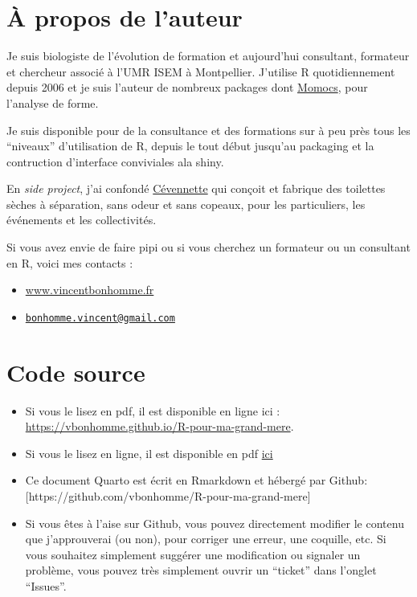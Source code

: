 \documentclass[
  letterpaper,
  DIV=11,
  numbers=noendperiod]{scrreprt}
\providecommand{\tightlist}{%
  \setlength{\itemsep}{0pt}\setlength{\parskip}{0pt}}\usepackage{longtable,booktabs,array}
\begin{document}
\hypertarget{uxe0-propos-de-lauteur}{%
\section*{À propos de l'auteur}\label{uxe0-propos-de-lauteur}}


Je suis biologiste de l'évolution de formation et aujourd'hui
consultant, formateur et chercheur associé à l'UMR ISEM à Montpellier.
J'utilise R quotidiennement depuis 2006 et je suis l'auteur de nombreux
packages dont \href{https://github.com/MomX/Momocs}{Momocs}, pour
l'analyse de forme.

Je suis disponible pour de la consultance et des formations sur à peu
près tous les ``niveaux'' d'utilisation de R, depuis le tout début
jusqu'au packaging et la contruction d'interface conviviales ala shiny.

En \emph{side project}, j'ai confondé
\href{https://www.cevennette.fr}{Cévennette} qui conçoit et fabrique des
toilettes sèches à séparation, sans odeur et sans copeaux, pour les
particuliers, les événements et les collectivités.

Si vous avez envie de faire pipi ou si vous cherchez un formateur ou un
consultant en R, voici mes contacts :

\begin{itemize}
\tightlist
\item
  \href{https://www.vincentbonhomme.fr}{www.vincentbonhomme.fr}
\item
  \href{mailto:bonhomme.vincent@gmail.com}{\nolinkurl{bonhomme.vincent@gmail.com}}
\end{itemize}

\hypertarget{code-source}{%
\section*{Code source}\label{code-source}}


\begin{itemize}
\tightlist
\item
  Si vous le lisez en pdf, il est disponible en ligne ici :
  \href{}{https://vbonhomme.github.io/R-pour-ma-grand-mere}.
\item
  Si vous le lisez en ligne, il est disponible en pdf
  \href{https://github.com/vbonhomme/R-pour-ma-grand-mere/blob/main/_book/R-pour-ma-grand-m\%C3\%A8re.pdf}{ici}
\item
  Ce document Quarto est écrit en Rmarkdown et hébergé par Github:
  {[}https://github.com/vbonhomme/R-pour-ma-grand-mere{]}
\item
  Si vous êtes à l'aise sur Github, vous pouvez directement modifier le
  contenu que j'approuverai (ou non), pour corriger une erreur, une
  coquille, etc. Si vous souhaitez simplement suggérer une modification
  ou signaler un problème, vous pouvez très simplement ouvrir un
  ``ticket'' dans l'onglet ``Issues''.
\end{itemize}
\end{document}
